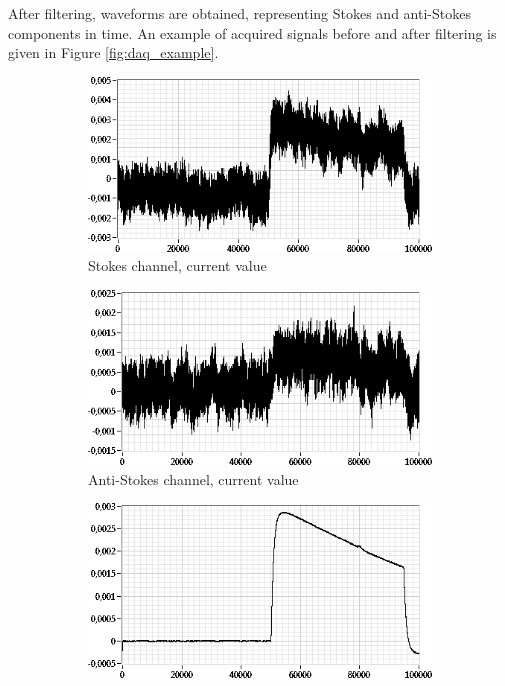 \documentclass{standalone}
\begin{document}
After filtering, waveforms are obtained, representing Stokes and anti-Stokes components in time. An example of acquired signals before and after filtering is given in Figure \ref{fig:daq_example}.
\begin{figure}[h]
	\centering
	\begin{subfigure}[b]{0.49\textwidth}
		\includegraphics[width=\textwidth]{daq_example_stokes_current.png}
		\caption{Stokes channel, current value}
	\end{subfigure}
	\begin{subfigure}[b]{0.49\textwidth}
		\includegraphics[width=\textwidth]{daq_example_antistokes_current.png}
		\caption{Anti-Stokes channel, current value}
	\end{subfigure}
	\begin{subfigure}[b]{0.49\textwidth}
		\includegraphics[width=\textwidth]{daq_example_stokes_filtered.png}

\end{subfigure}
\end{figure}
\end{document}
